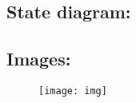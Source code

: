 \subsection{State diagram:}



\subsection{Images:}

\begin{figure}[H]
    \texttt{[image: img]}
    \centering
\end{figure}

